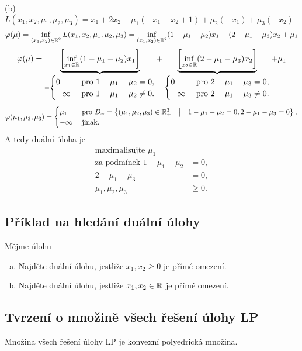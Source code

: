 (b) $L(x_1, x_2, \mu_1, \mu_2, \mu_3) = x_1 + 2x_2 + \mu_1(-x_1 -x_2 + 1) + \mu_2(-x_1) + \mu_3(-x_2)$
\[
    \varphi(\mu) = \inf_{(x_1, x_2) \in \mathbb{R}^2} L(x_1, x_2, \mu_1, \mu_2, \mu_3) = \inf_{(x_1, x_2) \in \mathbb{R}^2} 
    (1-\mu_1 - \mu_2)x_1 + (2-\mu_1-\mu_3)x_2 + \mu_1
\]
\[
    \varphi(\mu) = \underbrace{\left[\inf_{x_1 \in \mathbb{R}}(1-\mu_1-\mu_2)x_1\right]}_{=
    \begin{cases}
        0 & \text{ pro } 1-\mu_1-\mu_2 = 0, \\
        -\infty & \text{ pro } 1-\mu_1-\mu_2 \not= 0.
    \end{cases}} + \underbrace{\left[\inf_{x_2 \in \mathbb{R}}(2 - \mu_1 - \mu_3)x_2\right]}_{
    \begin{cases}
        0 & \text{ pro } 2-\mu_1-\mu_3 = 0, \\
        -\infty & \text{ pro } 2-\mu_1-\mu_3 \not= 0.
    \end{cases}} + \mu_1
\]
\[
    \varphi(\mu_1, \mu_2, \mu_3) = 
    \begin{cases}
        \mu_1 &\text{ pro } D_\varphi = \left\lbrace (\mu_1, \mu_2, \mu_3) \in \mathbb{R}^3_+ \quad \middle| \quad 1-\mu_1-\mu_2 = 0, 
         2-\mu_1-\mu_3 = 0 \right\rbrace, \\
        - \infty & \text{ jinak.}
    \end{cases}
\]
A tedy duální úloha je
\begin{align*}
    \text{maximalisujte } \mu_1 \\
    \text{za podmínek } 1 - \mu_1 - \mu_2 &= 0, \\
    2 - \mu_1 - \mu_3 &= 0, \\
    \mu_1, \mu_2, \mu_3 &\geq 0.
\end{align*}

\subsection{Příklad na hledání duální úlohy}
Mějme úlohu
\begin{enumerate}[(a)]
    \item Najděte duální úlohu, jestliže $x_1, x_2 \geq 0$ je přímé omezení.
    \item Najděte duální úlohu, jestliže $x_1, x_2 \in \mathbb{R}$ je přímé omezení.
\end{enumerate}

\subsection{Tvrzení o množině všech řešení úlohy LP}
Množina všech řešení úlohy LP je konvexní polyedrická množina.

